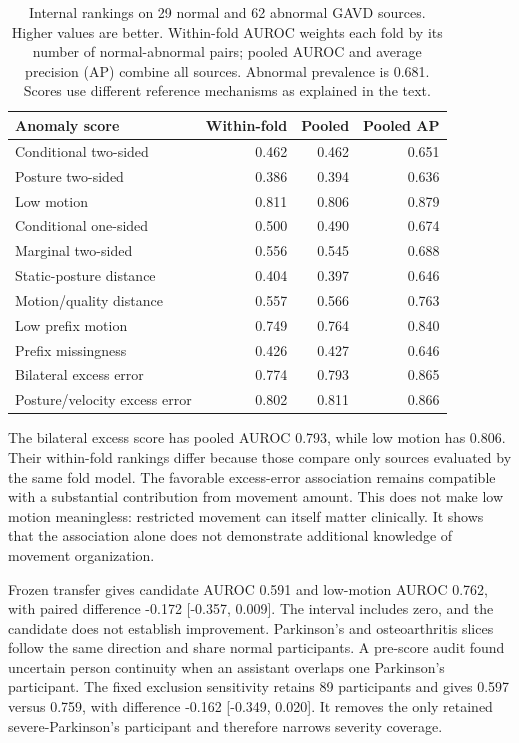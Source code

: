 \documentclass[letterpaper]{article}
\begin{document}
\begin{table}[t]
\centering
\footnotesize
\setlength{\tabcolsep}{3pt}
\begin{tabular}{>{\raggedright\arraybackslash}p{}rrr}
\toprule
Anomaly score & Within-fold & Pooled & Pooled AP \\
\midrule
Conditional two-sided & 0.462 & 0.462 & 0.651 \\
Posture two-sided & 0.386 & 0.394 & 0.636 \\
Low motion & 0.811 & 0.806 & 0.879 \\
Conditional one-sided & 0.500 & 0.490 & 0.674 \\
Marginal two-sided & 0.556 & 0.545 & 0.688 \\
Static-posture distance & 0.404 & 0.397 & 0.646 \\
Motion/quality distance & 0.557 & 0.566 & 0.763 \\
Low prefix motion & 0.749 & 0.764 & 0.840 \\
Prefix missingness & 0.426 & 0.427 & 0.646 \\
Bilateral excess error & 0.774 & 0.793 & 0.865 \\
Posture/velocity excess error & 0.802 & 0.811 & 0.866 \\
\bottomrule
\end{tabular}
\caption{Internal rankings on 29 normal and 62 abnormal GAVD sources. Higher values are better. Within-fold AUROC weights each fold by its number of normal-abnormal pairs; pooled AUROC and average precision (AP) combine all sources. Abnormal prevalence is 0.681. Scores use different reference mechanisms as explained in the text.}
\label{tab:rankings}
\end{table}

The bilateral excess score has pooled AUROC 0.793, while low motion has 0.806. Their within-fold rankings differ because those compare only sources evaluated by the same fold model. The favorable excess-error association remains compatible with a substantial contribution from movement amount. This does not make low motion meaningless: restricted movement can itself matter clinically. It shows that the association alone does not demonstrate additional knowledge of movement organization.

Frozen transfer gives candidate AUROC 0.591 and low-motion AUROC 0.762, with paired difference -0.172 [-0.357, 0.009]. The interval includes zero, and the candidate does not establish improvement. Parkinson's and osteoarthritis slices follow the same direction and share normal participants. A pre-score audit found uncertain person continuity when an assistant overlaps one Parkinson's participant. The fixed exclusion sensitivity retains 89 participants and gives 0.597 versus 0.759, with difference -0.162 [-0.349, 0.020]. It removes the only retained severe-Parkinson's participant and therefore narrows severity coverage.
\end{document}
